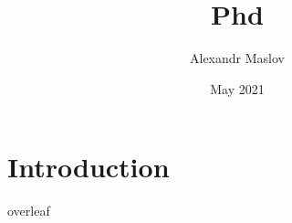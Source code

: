 \documentclass{article}
\title{Phd}
\author{Alexandr Maslov}
\date{May 2021}
\begin{document}
\maketitle

\section{Introduction}
overleaf
\end{document}
